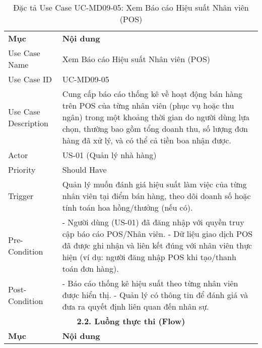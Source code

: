 \begin{longtable}{|m{4cm}|p{11cm}|}
\caption{Đặc tả Use Case UC-MD09-05: Xem Báo cáo Hiệu suất Nhân viên (POS)} \label{tab:uc_md09_05} \\
\hline

\endhead %
\hline
\endfoot %
\hline
\endlastfoot %
\multicolumn{2}{|c|}{\textbf{2.1. Tóm tắt (Summary)}} \\
\hline
\textbf{Mục} & \textbf{Nội dung} \\
\hline
Use Case Name & Xem Báo cáo Hiệu suất Nhân viên (POS) \\
\hline
Use Case ID & UC-MD09-05 \\
\hline
Use Case Description & Cung cấp báo cáo thống kê về hoạt động bán hàng trên POS của từng nhân viên (phục vụ hoặc thu ngân) trong một khoảng thời gian do người dùng lựa chọn, thường bao gồm tổng doanh thu, số lượng đơn hàng đã xử lý, và có thể cả tiền boa nhận được. \\
\hline
Actor & US-01 (Quản lý nhà hàng) \\
\hline
Priority & Should Have \\
\hline
Trigger & Quản lý muốn đánh giá hiệu suất làm việc của từng nhân viên tại điểm bán hàng, theo dõi doanh số hoặc tính toán hoa hồng/thưởng (nếu có). \\
\hline
Pre-Condition & - Người dùng (US-01) đã đăng nhập với quyền truy cập báo cáo POS/Nhân viên. \newline - Dữ liệu giao dịch POS đã được ghi nhận và liên kết đúng với nhân viên thực hiện (ví dụ: người đăng nhập POS khi tạo/thanh toán đơn hàng). \\
\hline
Post-Condition & - Báo cáo thống kê hiệu suất theo từng nhân viên được hiển thị. \newline - Quản lý có thông tin để đánh giá và đưa ra quyết định liên quan đến nhân sự. \\
\hline
\multicolumn{2}{|c|}{\textbf{2.2. Luồng thực thi (Flow)}} \\
\hline
\textbf{Mục} & \textbf{Nội dung} \\
\hline

\end{longtable}
